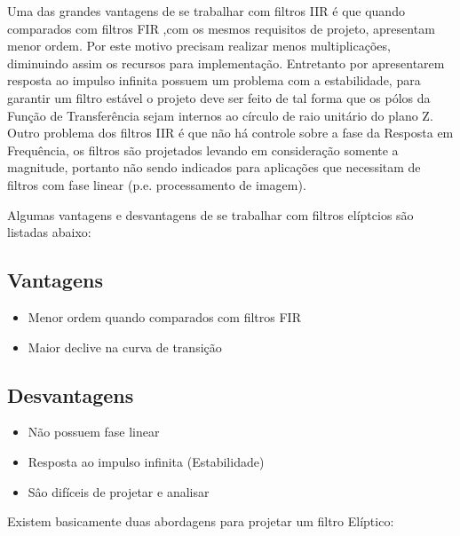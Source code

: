 \documentclass[a4paper,10pt]{article}
\begin{document}
Uma das grandes vantagens de se trabalhar com filtros IIR é que quando comparados com filtros FIR ,com os mesmos requisitos de projeto, apresentam menor ordem. Por este motivo precisam realizar menos multiplicações, diminuindo assim os recursos para implementação. Entretanto por apresentarem resposta ao impulso infinita possuem um problema com a estabilidade, para garantir um filtro estável o projeto deve ser feito de tal forma que os pólos da Função de Transferência  sejam internos ao círculo de raio unitário do plano Z. Outro problema dos filtros IIR é que não há controle sobre a fase da Resposta em Frequência, os filtros são projetados levando em consideração somente a magnitude, portanto não sendo indicados para aplicações que necessitam de filtros com fase linear (p.e. processamento de imagem).

Algumas vantagens e desvantagens de se trabalhar com filtros elíptcios são listadas abaixo:

\subsection{Vantagens}

	\begin{itemize}
		\item Menor ordem quando comparados com filtros FIR
		\item Maior declive na curva de transição
	\end{itemize}


\subsection{Desvantagens}

	\begin{itemize}
		\item Não possuem fase linear
		\item Resposta ao impulso infinita (Estabilidade)
		\item Sâo difíceis de projetar e analisar
	\end{itemize}


Existem basicamente duas abordagens para projetar um filtro Elíptico:
\end{document}
